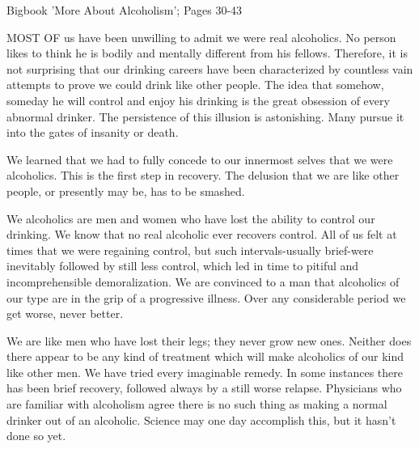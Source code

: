 

Bigbook 'More About Alcoholism'; Pages 30-43


\begin{biblechapter}

MOST OF us have been unwilling to admit we were real alcoholics. 
No person likes to think he is bodily and mentally different from his fellows.  
Therefore, it is not surprising that our drinking careers 
have been characterized by countless vain attempts to prove we could drink like other people.  
The idea that somehow, someday 
he will control and enjoy his drinking is the great obsession of every abnormal drinker.  
The persistence of this illusion is astonishing.  
Many pursue it into the gates of insanity or death.

We learned that we had to fully concede to our innermost selves that we were alcoholics. 
This is the first step in recovery. 
The delusion that we are like other people, or presently may be, has to be smashed.
\end{biblechapter}


\begin{biblechapter}

We alcoholics are men and women who have lost the ability to control our drinking. 
We know that no real alcoholic ever recovers control. 
All of us felt at times that we were regaining control, 
but such intervals-usually brief-were inevitably followed by still less control, 
which led in time to pitiful and incomprehensible demoralization. 
We are convinced to a man that alcoholics of our type are in the grip of a progressive illness. 
Over any considerable period we get worse, never better.

We are like men who have lost their legs; they never grow new ones. 
Neither does there appear to be any kind of treatment which will make alcoholics of our kind like other men. 
We have tried every imaginable remedy. 
In some instances there has been brief recovery, followed always by a still worse relapse. 
Physicians who are familiar with alcoholism 
agree there is no such thing as making a normal drinker out of an alcoholic. 
Science may one day accomplish this, but it hasn't done so yet.
\end{biblechapter}


